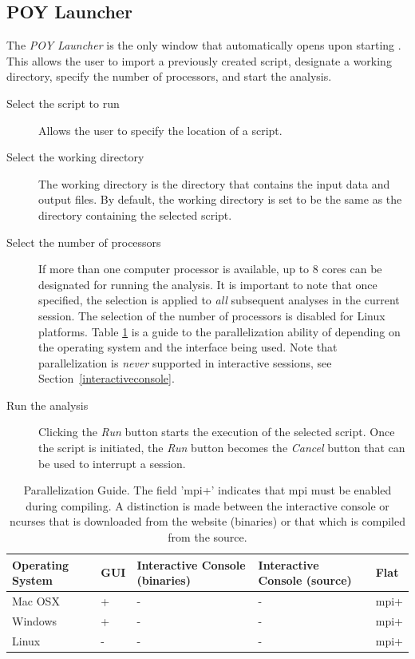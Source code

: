 \subsection{POY Launcher} 
The \emph{POY Launcher} is the only window that automatically opens upon starting \poy. This allows the user to 
import a previously created script, designate a working directory, specify the number of processors, and start the analysis.

\begin{description}
	\item[Select the script to run] 
	Allows the user to specify the location of a \poy script.
	\item[Select the working directory] 
	The working directory is the directory that contains 
	the input data and output files. By default, the working directory is set to be the same 
	as the directory containing the selected \poy script. 
	\item[Select the number of processors] 
	If more than one computer processor is available, up to 
	8 cores can be designated for running the analysis. It is important to note that once specified, the 
	selection is applied to \emph{all} subsequent analyses in the current \poy session. The selection 
	of the number of processors is disabled for Linux platforms. Table \ref{ParallelizationGuide} is a 
	guide to the parallelization ability of \poy depending on the operating system and the \poy interface 
	being used. Note that parallelization is \emph{never} supported in interactive sessions, see 
	Section~\ref{interactiveconsole}.
    	\item[Run the analysis] 
	Clicking the \emph{Run} button starts the execution of the selected script. 
	Once the script is initiated, the \emph{Run} button becomes the \emph{Cancel} button that can be 
	used to interrupt a \poy session.
\end{description}

\begin{table}[t] 
\small
\caption{Parallelization Guide. The field 'mpi+' indicates that mpi must be enabled during compiling. A distinction is made between the interactive console or ncurses that is downloaded from the website (binaries) or that which is compiled from the source.}
\label{ParallelizationGuide} 
\begin{center}
\renewcommand{\arraystretch}{1.5}
\begin{tabular}{p{3.0cm}  p{1.0cm}  p{2.60cm}  p{2.60cm}  p{1.0cm}} 
\hline
	Operating System & GUI & Interactive Console (binaries) & Interactive Console (source) & Flat \\
\hline
	Mac OSX & + & - & - & mpi+ \\
	Windows & + & - & - & mpi+ \\
	Linux & - & - & - & mpi+ \\
\hline
\end{tabular}
\end{center}
\end{table}

